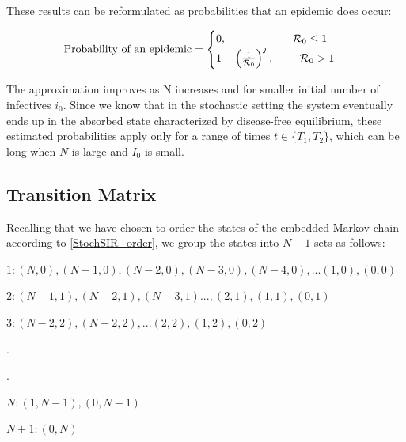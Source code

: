 \documentclass[reqno,11pt]{amsart}
\newcommand{\tab}{\hspace*{2em}}
\begin{document}
These results can be reformulated as probabilities that an epidemic does occur:

\begin{equation}
\text{Probability of an epidemic} = \begin{cases}
0, \text{\tab \tab \tab $\mathcal R_0 \le 1$} \\
1- \left ( \frac{1}{\mathcal R_0} \right ) ^j , \text{ \tab $\mathcal R_0 > 1$}
\end{cases}
\end{equation}

The approximation improves as N increases and for smaller initial number of infectives $i_0$. Since we know that in the stochastic setting the system eventually ends up in the absorbed state characterized by disease-free equilibrium, these estimated probabilities apply only for a range of times $t \in \lbrace T_1, T_2 \rbrace$, which can be long when $N$ is large and $I_0$ is small.
%
%
%
%
\subsection{Transition Matrix}
Recalling that we have chosen to order the states of the embedded Markov chain according to \eqref{StochSIR_order}, we group the states into $N+1$ sets as follows:

\tab \tab \tab $1: (N,0), (N-1,0), (N-2,0), (N-3,0),(N-4,0), ...(1,0), (0,0)	$ %

\tab \tab \tab \tab $ 2: (N-1,1), (N-2,1), (N-3,1)...,(2,1), (1,1), (0,1)	$ %

\tab \tab \tab \tab \tab $ 3: (N-2,2), (N-2,2),...(2,2), (1,2), (0,2)		$	%

\tab \tab \tab \tab \tab \tab . 	    	 					%

\tab \tab \tab \tab \tab \tab  \tab   . 	     						%

\tab \tab \tab \tab \tab \tab  \tab \tab $ N: (1,N-1), (0,N-1)$					%

\tab \tab \tab \tab \tab \tab  \tab \tab \tab $ N+1: (0,N) $						%
\end{document}

